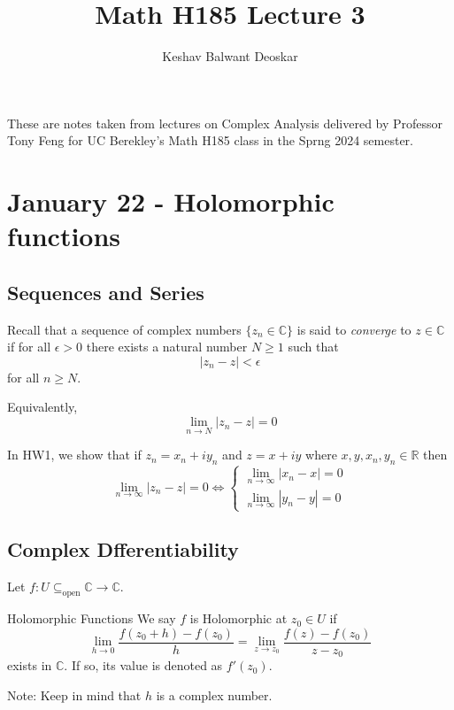 \documentclass{article}
\title{Math H185 Lecture 3}
\author{Keshav Balwant Deoskar}
\newcommand{\R}{\mathbb{R}}
\newcommand{\C}{\mathbb{C}}
\begin{document}
\maketitle

These are notes taken from lectures on Complex Analysis delivered by Professor Tony Feng for UC Berekley's Math H185 class in the Sprng 2024 semester.

\tableofcontents

\pagebreak

\section{January 22 - Holomorphic functions}

\vskip 1cm
\subsection{Sequences and Series}

\vskip 0.5cm
Recall that a sequence of complex numbers $\{z_n \in \C\}$ is said to \emph{converge} to $z \in \C$ if for all $\epsilon > 0$ there exists a natural number $N \geq 1$ such that 
\[ |z_n - z| < \epsilon \] for all $n \geq N$.

Equivalently, 
\[ \lim_{n \rightarrow N} |z_n - z| = 0 \]
\begin{dottedbox}
  In HW1, we show that if $z_n = x_n + iy_n$ and $z = x + iy$ where $x, y, x_n, y_n \in \R$ then
  \[ \lim_{n \rightarrow \infty} |z_n - z| = 0 \iff \begin{cases}
    \lim_{n \rightarrow \infty} |x_n - x| = 0 \\
    \lim_{n \rightarrow \infty} |y_n - y| = 0
  \end{cases} \]
\end{dottedbox}

\vskip 1cm
\subsection{Complex Dfferentiability}
Let $f : U \subseteq_{\text{open}} \C \rightarrow \C$.

\begin{mathdefinitionbox}{Holomorphic Functions}
\vskip 0.5cm
 We say $f$ is Holomorphic at $z_0 \in U$ if \[ \lim_{h \rightarrow 0} \frac{f(z_0 + h) - f(z_0)}{h} = \lim_{z \rightarrow z_0} \frac{f(z) - f(z_0)}{z - z_0} \] exists in $\C$. If so, its value is denoted as $f'(z_0)$. 

\vskip 0.5cm
Note: Keep in mind that $h$ is a complex number.
\end{mathdefinitionbox}
\end{document}
